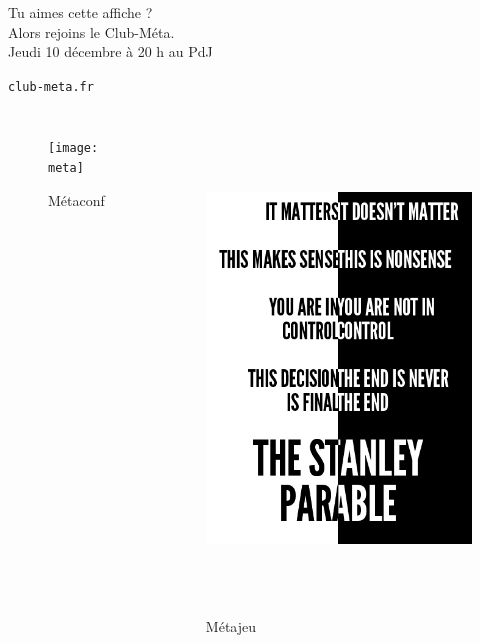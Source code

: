 \begin{frame}[fragile]

Tu aimes cette affiche ?\\
Alors \alert{rejoins le Club-Méta}.\\
Jeudi 10 décembre à 20 h au PdJ

\texttt{club-meta.fr}

\begin{columns}


\begin{figure}[htbp]
\centering
\texttt{[image: meta]}
\caption{Métaconf}
\end{figure}


\begin{figure}[htbp]
\centering
\includegraphics[height=1.30000\textwidth]{stanley}
\caption{Métajeu}
\end{figure}


\end{columns}
\end{frame}
